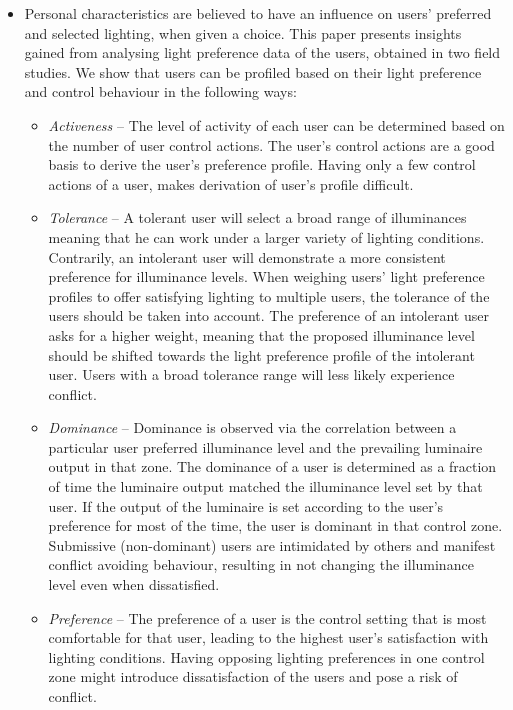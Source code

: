\documentclass[a4paper]{article}
\begin{document}
\begin{itemize}
\begin{itemize}
	\end{itemize}
\item Personal characteristics are believed to have an influence on users’ preferred and selected lighting, when given a choice. This paper presents insights gained from analysing light preference data of the users, obtained in two field studies. We show that users can be profiled based on their light preference and control behaviour in the following ways:
	\begin{itemize}
	\item \textit{Activeness} – The level of activity of each user can be determined based on the number of user control actions. The user’s control actions are a good basis to derive the user’s preference profile. Having only a few control actions of a user, makes derivation of user’s profile difficult. 
	\item \textit{Tolerance} – A tolerant user will select a broad range of illuminances meaning that he can work under a larger variety of lighting conditions. Contrarily, an intolerant user will demonstrate a more consistent preference for illuminance levels. When weighing users’ light preference profiles to offer satisfying lighting to multiple users, the tolerance of the users should be taken into account. The preference of an intolerant user asks for a higher weight, meaning that the proposed illuminance level should be shifted towards the light preference profile of the intolerant user. Users with a broad tolerance range will less likely experience conflict.
	\item \textit{Dominance} – Dominance is observed via the correlation between a particular user preferred illuminance level and the prevailing luminaire output in that zone. The dominance of a user is determined as a fraction of time the luminaire output matched the illuminance level set by that user. If the output of the luminaire is set according to the user’s preference for most of the time, the user is dominant in that control zone. Submissive (non-dominant) users are intimidated by others and manifest conflict avoiding behaviour, resulting in not changing the illuminance level even when dissatisfied.
	\item \textit {Preference} – The preference of a user is the control setting that is most comfortable for that user, leading to the highest user’s satisfaction with lighting conditions. Having opposing lighting preferences in one control zone might introduce dissatisfaction of the users and pose a risk of conflict.
	\end{itemize}

\end{itemize}
\end{document}
